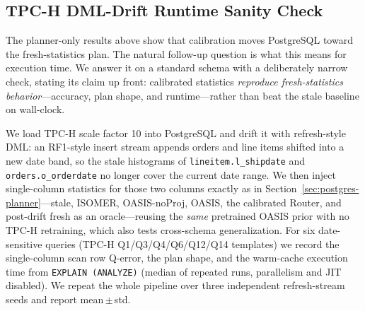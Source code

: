 \documentclass[preprint,12pt]{elsarticle}
\newcommand{\oasisUseMaxWidthResize}[1]{%
  \renewcommand{\resizebox}[3]{\adjustbox{max width=#1}{##3}}%
}
\begin{document}
\subsection{TPC-H DML-Drift Runtime Sanity Check}
\label{sec:tpch-runtime}

The planner-only results above show that calibration moves PostgreSQL toward the
fresh-statistics plan. The natural follow-up question is what this means for
execution time. We answer it on a standard schema with a deliberately narrow
check, stating its claim up front: calibrated statistics
\emph{reproduce fresh-statistics behavior}---accuracy, plan shape, and
runtime---rather than beat the stale baseline on wall-clock.

We load TPC-H scale factor 10 into PostgreSQL and drift it with refresh-style DML:
an RF1-style insert stream appends orders and line items shifted into a new date
band, so the stale histograms of \texttt{lineitem.l\_shipdate} and
\texttt{orders.o\_orderdate} no longer cover the current date range. We then
inject single-column statistics for those two columns exactly as in
Section~\ref{sec:postgres-planner}---stale, ISOMER, OASIS-noProj, OASIS, the
calibrated Router, and post-drift fresh as an oracle---reusing the \emph{same}
pretrained OASIS prior with no TPC-H retraining, which also tests cross-schema
generalization. For six date-sensitive queries (TPC-H Q1/Q3/Q4/Q6/Q12/Q14
templates) we record the single-column scan row Q-error, the plan shape, and the
warm-cache execution time from \texttt{EXPLAIN (ANALYZE)} (median of repeated
runs, parallelism and JIT disabled). We repeat the whole pipeline over three
independent refresh-stream seeds and report mean\,$\pm$\,std.

\begingroup
\oasisUseMaxWidthResize{.92\columnwidth}

\endgroup
\end{document}
